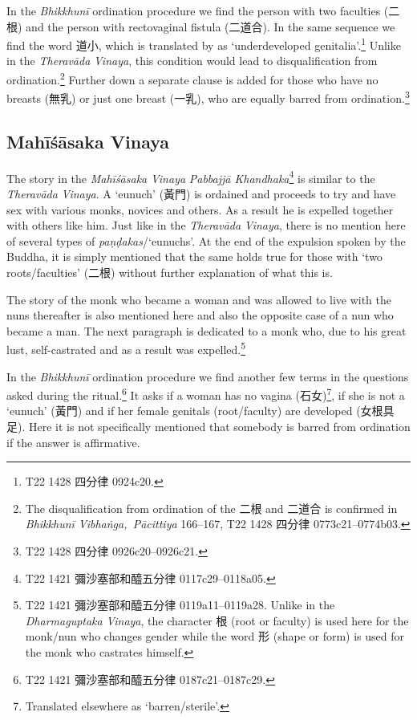 In the {\em Bhikkhunī} ordination procedure we find the person with two faculties (二根) and the person with rectovaginal fistula (二道合). In the same sequence we find the word 道小, which is translated by \cite{bodhi} as `underdeveloped genitalia'.\footnote{T22 1428 四分律 0924c20.} Unlike in the {\em Theravāda} {\em Vinaya}, this condition would lead to disqualification from ordination.\footnote{The disqualification from ordination of the 二根 and 二道合 is confirmed in {\em Bhikkhunī Vibhaṅga, Pācittiya} 166–167, T22 1428 四分律 0773c21–0774b03.} Further down a separate clause is added for those who have no breasts (無乳) or just one breast (一乳), who are equally barred from ordination.\footnote{T22 1428 四分律 0926c20–0926c21.}

\subsection{Mahīśāsaka Vinaya}
The story in the {\em Mahīśāsaka} {\em Vinaya} {\em Pabbajjā Khandhaka}\footnote{T22 1421 彌沙塞部和醯五分律 0117c29–0118a05.} is similar to the {\em Theravāda} {\em Vinaya}. A `eunuch' (黃門) is ordained and proceeds to try and have sex with various monks, novices and others. As a result he is expelled together with others like him. Just like in the {\em Theravāda} {\em Vinaya}, there is no mention here of several types of {\em paṇḍakas}/`eunuchs'. At the end of the expulsion spoken by the Buddha, it is simply mentioned that the same holds true for those with `two roots/faculties' (二根) without further explanation of what this is.

The story of the monk who became a woman and was allowed to live with the nuns thereafter is also mentioned here and also the opposite case of a nun who became a man. The next paragraph is dedicated to a monk who, due to his great lust, self-castrated and as a result was expelled.\footnote{T22 1421 彌沙塞部和醯五分律 0119a11–0119a28. Unlike in the {\em Dharmaguptaka} {\em Vinaya}, the character 根 (root or faculty) is used here for the monk/nun who changes gender while the word 形 (shape or form) is used for the monk who castrates himself.} 

In the {\em Bhikkhunī} ordination procedure we find another few terms in the questions asked during the ritual.\footnote{T22 1421 彌沙塞部和醯五分律 0187c21–0187c29.} It asks if a woman has no vagina (石女)\footnote{Translated elsewhere as `barren/sterile'.}, if she is not a `eunuch' (黃門) and if her female genitals (root/faculty) are developed (女根具足). Here it is not specifically mentioned that somebody is barred from ordination if the answer is affirmative.

